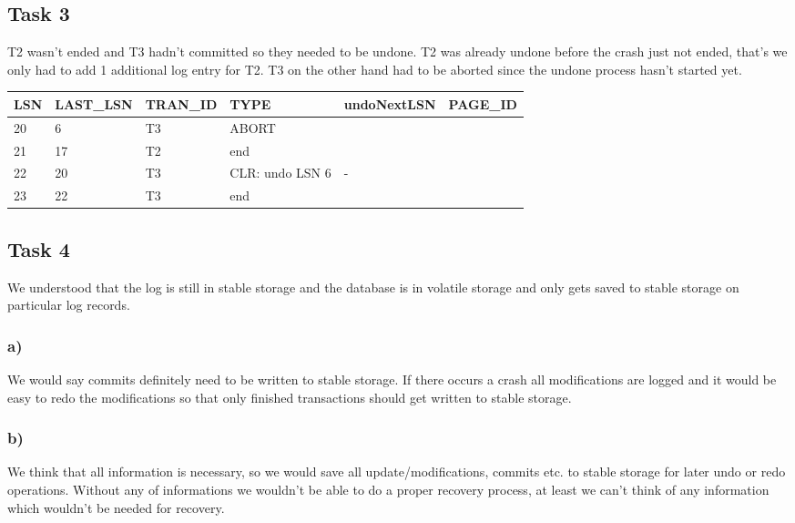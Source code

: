 \documentclass[12pt,a4paper]{article}
\begin{document}
\subsection{Task 3}
T2 wasn't ended and T3 hadn't committed so they needed to be undone.
T2 was already undone before the crash just not ended, that's we only had to add 1 additional log entry for T2.
T3 on the other hand had to be aborted since the undone process hasn't started yet.

\begin{table}[!htbp]
    \centering
    \begin{tabularx}{\textwidth}{l|l|l|l|l|l}
        \hline
        LSN & LAST\_LSN & TRAN\_ID & TYPE & undoNextLSN & PAGE\_ID \\ 
        \hline
        20 & 6  & T3 & ABORT & & \\
        21 & 17 & T2 & end & & \\
        22 & 20 & T3 & CLR: undo LSN 6 & - & \\  
      	23 & 22 & T3 & end & & \\ 
        \hline
    \end{tabularx}
\end{table}
\newpage
\subsection{Task 4}
We understood that the log is still in stable storage and the database is in volatile storage and only gets saved to stable storage on particular log records.
\subsubsection{a)}
We would say commits definitely need to be written to stable storage. If there occurs a crash all modifications are logged and it would be easy to redo the modifications so that only finished transactions should get written to stable storage.

\subsubsection{b)}
We think that all information is necessary, so we would save all update/modifications, commits etc. to stable storage for later undo or redo operations.
Without any of informations we wouldn't be able to do a proper recovery process, at least we can't think of any information which wouldn't be needed for recovery.
\end{document}
